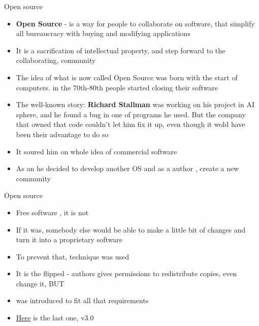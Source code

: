 \documentclass[usenames,dvipsnames,10pt,aspectratio=169]{beamer}
\begin{document}
\begin{frame}{Open source}
    \begin{itemize}
        \item \textbf{Open Source} - is a way for people to collaborate on software, that simplify all bureaucracy with buying and modifying applications
        \item It is a sacrification of intellectual property, and step forward to the collaborating, community
        \item The idea of what is now called Open Source was born with the start of computers. in the 70th-80th people started closing their software
        \item The well-known story: \textbf{Richard Stallman} was working on his project in AI sphere, and he found a bug in one of programs he used. But the company that owned that code couldn't let him fix it up, even though it wold have been their advantage to do so
        \item It soured him on whole idea of commercial software
        \item As an  he decided to develop another OS and as a author , create a new community
    \end{itemize}
\end{frame}

\begin{frame}{Open source}
    \begin{itemize}
        \item Free software , it is not 
        \item If it was, somebody else would be able to make a little bit of changes and turn it into a proprietary software
        \item To prevent that,  technique was used
        \item It is the flipped  - authors gives permissions to redistribute copies, even change it, BUT 
        \item {} was introduced to fit all that requirements
        \item \href{https://www.gnu.org/licenses/gpl-3.0.en.html}{Here} is the last one, v3.0
    \end{itemize}
\end{frame}
\end{document}

